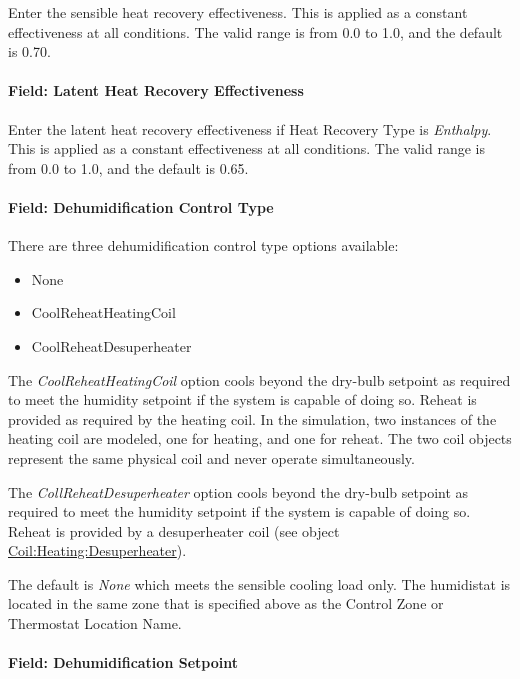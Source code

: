 Enter the sensible heat recovery effectiveness. This is applied as a constant effectiveness at all conditions. The valid range is from 0.0 to 1.0, and the default is 0.70.

\paragraph{Field: Latent Heat Recovery Effectiveness}\label{field-latent-heat-recovery-effectiveness-1}

Enter the latent heat recovery effectiveness if Heat Recovery Type is \emph{Enthalpy}. This is applied as a constant effectiveness at all conditions. The valid range is from 0.0 to 1.0, and the default is 0.65.

\paragraph{Field: Dehumidification Control Type}\label{field-dehumidification-control-type-1}

There are three dehumidification control type options available:

\begin{itemize}
\item
  None
\item
  CoolReheatHeatingCoil
\item
  CoolReheatDesuperheater
\end{itemize}

The \emph{CoolReheatHeatingCoil} option cools beyond the dry-bulb setpoint as required to meet the humidity setpoint if the system is capable of doing so. Reheat is provided as required by the heating coil. In the simulation, two instances of the heating coil are modeled, one for heating, and one for reheat. The two coil objects represent the same physical coil and never operate simultaneously.

The \emph{CollReheatDesuperheater} option cools beyond the dry-bulb setpoint as required to meet the humidity setpoint if the system is capable of doing so. Reheat is provided by a desuperheater coil (see object \hyperref[coilheatingdesuperheater]{Coil:Heating:Desuperheater}).

The default is \emph{None} which meets the sensible cooling load only. The humidistat is located in the same zone that is specified above as the Control Zone or Thermostat Location Name.

\paragraph{Field: Dehumidification Setpoint}\label{field-dehumidification-setpoint-1}

